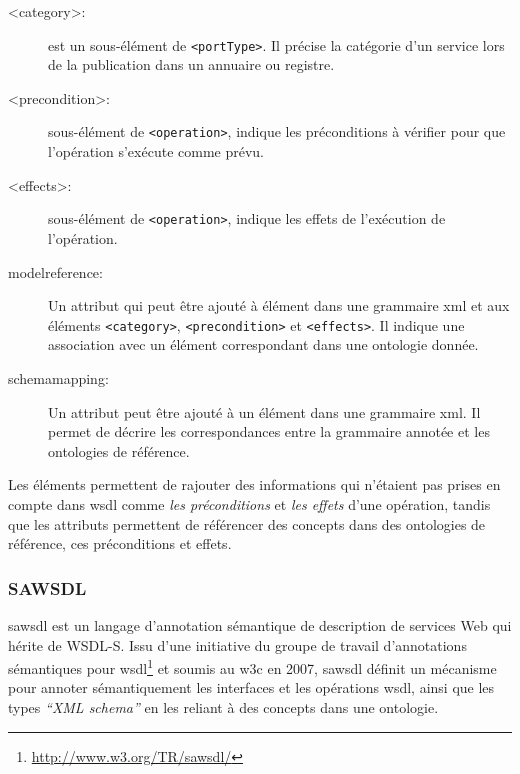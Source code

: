     \renewcommand{\descriptionlabel}[1]{\hspace{0.5cm}\textbullet~\texttt{#1}}
    \begin{description}
    \item [<category>:] est un sous-élément de \texttt{<portType>}. Il
      précise la catégorie d'un service lors de la publication dans un
      annuaire ou registre.

    \item [<precondition>:] sous-élément de \texttt{<operation>},
      indique les préconditions à vérifier pour que l'opération
      s'exécute comme prévu.

    \item [<effects>:] sous-élément de \texttt{<operation>}, indique
      les effets de l'exécution de l'opération.

    \item [modelreference:] Un attribut qui peut être ajouté à élément
      dans une grammaire \acrshort{xml} et aux éléments
      \texttt{<category>}, \texttt{<precondition>} et
      \texttt{<effects>}. Il indique une association avec un élément
      correspondant dans une ontologie donnée.

    \item [schemamapping:] Un attribut peut être ajouté à un élément
      dans une grammaire \acrshort{xml}. Il permet de décrire les
      correspondances entre la grammaire annotée et les ontologies de
      référence.
    \end{description}
    \enddescription
    \bigskip

    Les éléments permettent de rajouter des informations
    qui n'étaient pas prises en compte dans \acrshort{wsdl} comme
    \emph{les préconditions} et \emph{les effets} d'une opération,
    tandis que les attributs permettent de référencer des concepts
    dans des ontologies de référence, ces préconditions et effets.

    \subsubsection{SAWSDL}
    \acrshort{sawsdl} \cite{kopecky2007sawsdl} est un langage
    d'annotation sémantique de description de services Web qui hérite
    de \textsc{WSDL-S}. Issu d'une initiative du groupe de travail
    d'annotations sémantiques pour
    \acrshort{wsdl}\footnote{\url{http://www.w3.org/TR/sawsdl/}} et
    soumis au \acrshort{w3c} en 2007, \acrshort{sawsdl} définit un
    mécanisme pour annoter sémantiquement les interfaces et les
    opérations \acrshort{wsdl}, ainsi que les types \textit{``XML
      schema''} en les reliant à des concepts dans une
    ontologie.\medskip

